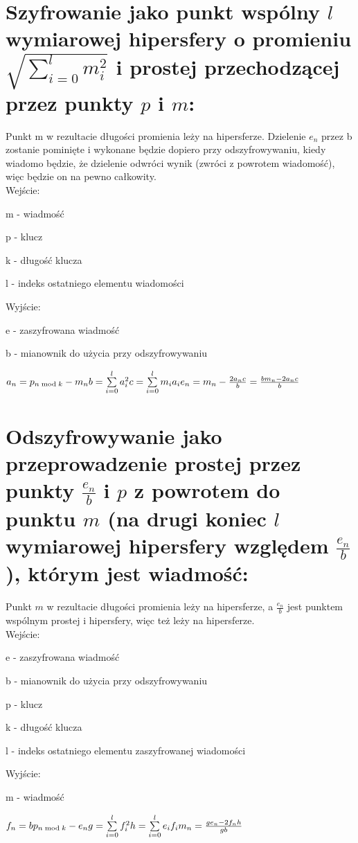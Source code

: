 \documentclass[11pt]{article}
\begin{document}
	\section{
	Szyfrowanie jako punkt wspólny \ensuremath{l} wymiarowej hipersfery o promieniu\ensuremath{\sqrt{\sum\limits_{i=0}^l m^2_i}} i prostej przechodzącej przez punkty \ensuremath{p} i \ensuremath{m}:
	}
	Punkt m w rezultacie długości promienia leży na hipersferze.
	Dzielenie \ensuremath{e_n} przez b zostanie pominięte i wykonane będzie dopiero przy odszyfrowywaniu, kiedy wiadomo będzie, że dzielenie odwróci wynik (zwróci z powrotem wiadomość), więc będzie on na pewno całkowity.\\
	Wejście:
	\begin{description}
	\item m - wiadmość
	\item p - klucz
	\item k - długość klucza
	\item l - indeks ostatniego elementu wiadomości
	\end{description}
	Wyjście:
	\begin{description}
	\item e - zaszyfrowana wiadmość
	\item b - mianownik do użycia przy odszyfrowywaniu
	\end{description} 
	\ensuremath {
		a_n = p_{n \bmod{k}} - m_n \\
		b = \sum\limits_{i=0}^l a_i^2 \\
		c = \sum\limits_{i=0}^l m_ia_i \\
		e_n = m_n - \frac{2a_nc}{b} = \frac{bm_n - 2a_nc}{b}
	}
	\newpage
		\section{
	Odszyfrowywanie jako przeprowadzenie prostej przez punkty \ensuremath{\frac{e_n}{b}} i \ensuremath{p} z powrotem do punktu \ensuremath{m} (na drugi koniec \ensuremath{l} wymiarowej hipersfery względem \ensuremath{\frac{e_n}{b}}), którym jest wiadmość:
	}
	Punkt \ensuremath{m} w rezultacie długości promienia leży na hipersferze, a \ensuremath{\frac{e_n}{b}} jest punktem wspólnym prostej i hipersfery, więc też leży na hipersferze.\\
	Wejście:
	\begin{description}
	\item e - zaszyfrowana wiadmość
	\item b - mianownik do użycia przy odszyfrowywaniu
	\item p - klucz
	\item k - długość klucza
	\item l - indeks ostatniego elementu zaszyfrowanej wiadomości
	\end{description} 
	Wyjście:
	\begin{description}
	\item m - wiadmość
	\end{description}
	\ensuremath {
		f_n = bp_{n \bmod{k}} - e_n \\
		g = \sum\limits_{i=0}^l f_i^2 \\
		h = \sum\limits_{i=0}^l e_if_i \\
		m_n = \frac{ge_n - 2f_nh}{gb}
	}
\end{document}
